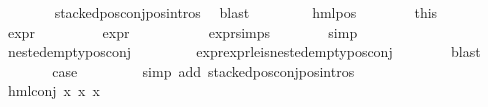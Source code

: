 \begin{isabellebody}
\ \ \ \ \ \ \isamarkupfalse%
\ stacked{\isacharunderscore}{\kern0pt}pos{\isacharunderscore}{\kern0pt}conj{\isacharunderscore}{\kern0pt}pos{\isachardot}{\kern0pt}intros{\isacharparenleft}{\kern0pt}{}{\isacharparenright}{\kern0pt}\ \isamarkupfalse%
\ blast\isanewline
\ \ \isamarkupfalse%
\isanewline
\ \ \ \ \isamarkupfalse%
\ {\isacharparenleft}{\kern0pt}hml{\isacharunderscore}{\kern0pt}pos\ {\isasymalpha}\ {\isasympsi}{\isacharparenright}{\kern0pt}\isanewline
\ \ \ \ \isamarkupfalse%
\ this{\isacharparenleft}{\kern0pt}{}{\isacharcomma}{\kern0pt}\ {}{\isacharparenright}{\kern0pt}\ \isamarkupfalse%
\ {\isachardoublequoteopen}expr{\isacharunderscore}{\kern0pt}{}\ {\isasympsi}\ {\isasymle}\ {}{\isachardoublequoteclose}\isanewline
\ \ \ \ \ \ {\isachardoublequoteopen}expr{\isacharunderscore}{\kern0pt}{}\ {\isasympsi}\ {\isasymle}\ {}{\isachardoublequoteclose}\isanewline
\ \ \ \ \ \ \isamarkupfalse%
\ expr{\isacharunderscore}{\kern0pt}{}{\isachardot}{\kern0pt}simps\isanewline
\ \ \ \ \ \ \isamarkupfalse%
\ simp{\isacharplus}{\kern0pt}\isanewline
\ \ \ \ \isamarkupfalse%
\ {\isachardoublequoteopen}nested{\isacharunderscore}{\kern0pt}empty{\isacharunderscore}{\kern0pt}pos{\isacharunderscore}{\kern0pt}conj\ {\isasympsi}{\isachardoublequoteclose}\isanewline
\ \ \ \ \ \ \isamarkupfalse%
\ expr{\isacharunderscore}{\kern0pt}{}{\isacharunderscore}{\kern0pt}expr{\isacharunderscore}{\kern0pt}{}{\isacharunderscore}{\kern0pt}le{\isacharunderscore}{\kern0pt}{}{\isacharunderscore}{\kern0pt}is{\isacharunderscore}{\kern0pt}nested{\isacharunderscore}{\kern0pt}empty{\isacharunderscore}{\kern0pt}pos{\isacharunderscore}{\kern0pt}conj\isanewline
\ \ \ \ \ \ \isamarkupfalse%
\ blast\isanewline
\ \ \ \ \isamarkupfalse%
\ \isamarkupfalse%
\ {\isacharquery}{\kern0pt}case\ \isanewline
\ \ \ \ \ \ \isamarkupfalse%
\ {\isacharparenleft}{\kern0pt}simp\ add{\isacharcolon}{\kern0pt}\ stacked{\isacharunderscore}{\kern0pt}pos{\isacharunderscore}{\kern0pt}conj{\isacharunderscore}{\kern0pt}pos{\isachardot}{\kern0pt}intros{\isacharparenleft}{\kern0pt}{}{\isacharparenright}{\kern0pt}{\isacharparenright}{\kern0pt}\isanewline
\ \ \isamarkupfalse%
\isanewline
\ \ \ \ \isamarkupfalse%
\ {\isacharparenleft}{\kern0pt}hml{\isacharunderscore}{\kern0pt}conj\ x{}{}\ x{}{}\ x{}{}{\isacharparenright}{\kern0pt}\isanewline

\end{isabellebody}
